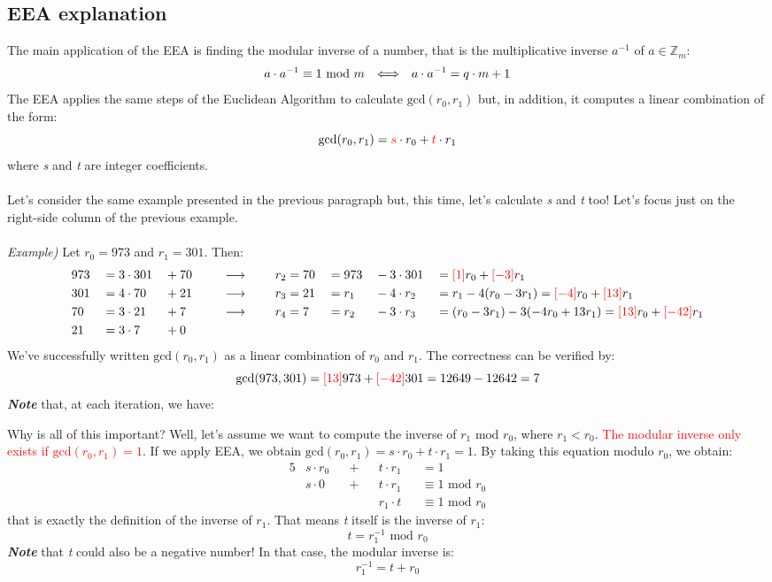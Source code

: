 \documentclass[11pt, a4paper]{article}
\newcommand{\consegue}{\hspace{0.5cm}\longrightarrow\hspace{0.5cm}}
\newcommand{\mymod}{
    \text{ mod }
}
\newcommand{\ifonlyif}{\hspace{0.25cm}\Longleftrightarrow\hspace{0.25cm}}
\begin{document}
\newpage
\subsection{EEA explanation}
The main application of the EEA is finding the modular inverse of a number, that is the multiplicative inverse $a^{-1}$ of $a\in\mathbb{Z}_m$:
$$a\cdot a^{-1}\equiv1\mymod m\ifonlyif a\cdot a^{-1}=q\cdot m + 1$$
The EEA applies the same steps of the Euclidean Algorithm to calculate $\text{gcd}(r_0,r_1)$ but, in addition, it computes a linear combination of the form:
$$\text{gcd}(r_0,r_1)=\textcolor{red}{s}\cdot r_0 + \textcolor{red}{t}\cdot r_1$$
where \textit{s} and \textit{t} are integer coefficients.\\\\
Let's consider the same example presented in the previous paragraph but, this time, let's calculate \textit{s} and \textit{t} too! Let's focus just on the right-side column of the previous example.\\\\
\textit{Example)} Let $r_0=973$ and $r_1=301$. Then:
\begin{alignat*}{8}
    &973&&=3\cdot301&&+70&&\consegue &&r_2=70&&=973&&-3\cdot301&&=\textcolor{red}{[1]}r_0+\textcolor{red}{[-3]}r_1\\
    &301&&=4\cdot70&&+21&&\consegue &&r_3=21&&=r_1&&-4\cdot r_2&&=r_1-4(r_0-3r_1)=\textcolor{red}{[-4]}r_0+\textcolor{red}{[13]}r_1\\
    &70&&=3\cdot21&&+7&&\consegue &&r_4=7&&=r_2&&-3\cdot r_3&&=(r_0-3r_1)-3(-4r_0+13r_1)=\textcolor{red}{[13]}r_0+\textcolor{red}{[-42]}r_1\\
    &21&&=3\cdot7&&+0
\end{alignat*}
We've successfully written $\text{gcd}(r_0,r_1)$ as a linear combination of $r_0$ and $r_1$. The correctness can be verified \nolinebreak by:
$$\text{gcd}(973,301)=\textcolor{red}{[13]}973+\textcolor{red}{[-42]}301=12649-12642=7$$
\textbf{\textit{Note}} that, at each iteration, we have:
\begin{center}
\end{center}
Why is all of this important? Well, let's assume we want to compute the inverse of $r_1\mymod r_0$, where $r_1<r_0$. \textcolor{red}{The modular inverse only exists if $\text{gcd}(r_0,r_1)=1$}. If we apply EEA, we obtain $\text{gcd}(r_0,r_1)=s\cdot r_0+t\cdot r_1=1$. By taking this equation modulo $r_0$, we obtain:
\begin{alignat*}{5}
    &s\cdot r_0&&+&&t\cdot r_1&&=1\\
    &s\cdot 0&&+&&t\cdot r_1&&\equiv1\mymod r_0\\
    & &&&&r_1\cdot t&&\equiv 1\mymod r_0
\end{alignat*}
that is exactly the definition of the inverse of $r_1$. That means \textit{t} itself is the inverse of $r_1$:
$$t=r_1^{-1}\mymod r_0$$
\textbf{\textit{Note}} that \textit{t} could also be a negative number! In that case, the modular inverse is: $$r_1^{-1}=t+r_0$$
\end{document}
